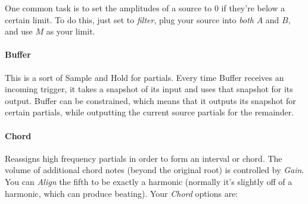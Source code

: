 \documentclass{article}
\begin{document}
One common task is to set the amplitudes of a source to 0 if they're below a certain limit. To do this, just set to {\it filter}, plug your source into {\it both} \(A\) and \(B\), and use \(M\) as your limit.


\paragraph{Buffer}  This is a sort of Sample and Hold for partials.  Every time Buffer receives an incoming trigger, it takes a snapshot of its input and uses that snapshot for its output.  Buffer can be constrained, which means that it outputs its snapshot for certain partials, while outputting the current source partials for the remainder.

\paragraph{Chord}  Reassigns high frequency partials in order to form an interval or chord.  The volume of additional chord notes (beyond the original root) is controlled by {\it Gain}.  You can {\it Align} the fifth to be exactly a harmonic (normally it's slightly off of a harmonic, which can produce beating).   Your {\it Chord} options are:
\end{document}
